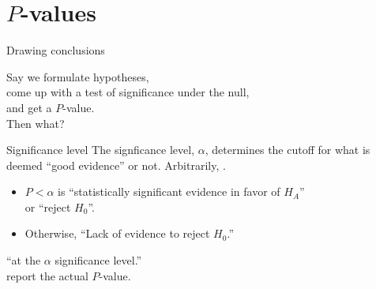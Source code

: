 \section{$P$-values}

\begin{frame}{Drawing conclusions}

  Say we formulate hypotheses, \\
  come up with a test of significance under the null,\\
  and get a $P$-value. \\
  Then what?
  
  \vspace{2em}

  \begin{block}{Significance level}
    The signficance level, $\alpha$, determines the cutoff
    for what is deemed ``good evidence'' or not.
    Arbitrarily, .
  \end{block}
  
  \vspace{2em}

  \begin{itemize}
    \item $P < \alpha$ is ``statistically significant evidence in favor of $H_A$'' \\
      or ``reject $H_0$''.
    \item Otherwise, ``Lack of evidence to reject $H_0$.''
  \end{itemize}
   ``at the $\alpha$ significance level.''\\
   report the actual $P$-value.


\end{frame}


